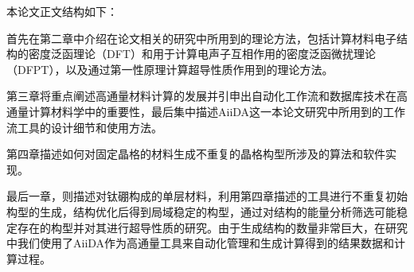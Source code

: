 本论文正文结构如下：
\begin{romanenum}
  \item 首先在第二章中介绍在论文相关的研究中所用到的理论方法，包括计算材料电子结构的密度泛函理论（DFT）和用于计算电声子互相作用的密度泛函微扰理论（DFPT），以及通过第一性原理计算超导性质作用到的理论方法。
  \item 第三章将重点阐述高通量材料计算的发展并引申出自动化工作流和数据库技术在高通量计算材料学中的重要性，最后集中描述AiiDA这一本论文研究中所用到的工作流工具的设计细节和使用方法。
  \item 第四章描述如何对固定晶格的材料生成不重复的晶格构型所涉及的算法和软件实现。
  \item 最后一章，则描述对钛硼构成的单层材料，利用第四章描述的工具进行不重复初始构型的生成，结构优化后得到局域稳定的构型，通过对结构的能量分析筛选可能稳定存在的构型并对其进行超导性质的研究。由于生成结构的数量非常巨大，在研究中我们使用了AiiDA作为高通量工具来自动化管理和生成计算得到的结果数据和计算过程。
\end{romanenum}
